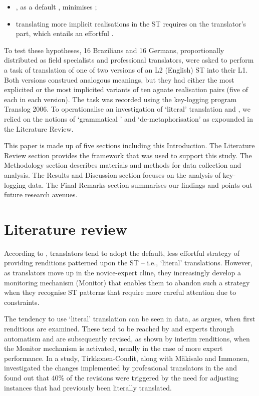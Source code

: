 \documentclass[output=paper]{LSP/langsci}
\begin{document}
\begin{itemize}
\item {}, as a default , minimises ; 
\item translating more implicit realisations in the ST requires  on the translator's part, which entails an effortful .
\end{itemize}

To test these hypotheses, 16 Brazilians and 16 Germans, proportionally distributed as field specialists and professional translators, were asked to perform a task of translation of one of two versions of an L2 (English) ST into their L1. Both versions construed analogous meanings, but they had either the most explicited or the most implicited variants of ten agnate realisation pairs (five of each in each version). The task was recorded using the key-logging program Translog 2006. To operationalise an investigation of `literal' translation and , we relied on the notions of `grammatical ' and `de-meta\-phor\-i\-sa\-tion' as expounded in the Literature Review.

This paper is made up of five sections including this Introduction. The Literature Review section provides the framework that was used to support this study. The Methodology section describes materials and methods for data collection and analysis. The Results and Discussion section focuses on the analysis of key-logging data. The Final Remarks section summarises our findings and points out future research avenues.

\section{Literature review} 

According to \citet{TirkkonenCondit2005}, translators tend to adopt the default, less effortful strategy of providing renditions patterned upon the ST -- i.e., `literal' translations. However, as translators move up in the novice-expert cline, they increasingly develop a monitoring mechanism (Monitor) that enables them to abandon such a strategy when they recognise ST patterns that require more careful attention due to  constraints. 

The tendency to use `literal' translation can be seen in  data, as \citet{TirkkonenCondit2005} argues, when first renditions are examined. These tend to be reached by  and experts through automatism and are subsequently revised, as shown by interim renditions, when the Monitor mechanism is activated, usually in the case of more expert performance. In a \citeyear{TirkkonenCondit2006} study, Tirkkonen-Condit, along with Mäkisalo and Immonen, investigated the changes implemented by professional translators in the  and found out that 40\% of the revisions were triggered by the need for adjusting instances that had previously been literally translated.
\end{document}
